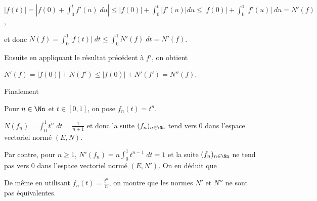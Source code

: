 {{\begin{center}
$|f(t)| = |f(0) +\int_{0}^{t}f'(u)\;du|\leqslant|f(0)|+\int_{0}^{t}|f'(u)|du\leqslant |f(0)|+\int_{0}^{1}|f'(u)|\;du =N'(f)$,
\end{center}

et donc $N(f) =\int_{0}^{1}|f(t)|\;dt\leqslant\int_{0}^{1}N'(f)\;dt=N'(f)$.

Ensuite en appliquant le résultat précédent à $f'$,  on obtient 

\begin{center}
$N'(f)=|f(0)|+N(f')\leqslant|f(0)|+N'(f')=N''(f)$.
\end{center}

Finalement 

\begin{center}
\end{center}

Pour $n\in\Nn$ et $t\in[0,1]$, on pose $f_n(t) = t^n$. 

$N(f_n)=\int_{0}^{1}t^n\;dt= \frac{1}{n+1}$ et donc la suite $(f_n)_{n\in\Nn}$ tend vers $0$ dans l'espace vectoriel normé $(E,N)$.

Par contre, pour $n\geqslant1$, $N'(f_n)=n\int_{0}^{1}t^{n-1}\;dt=1$ et la suite $(f_n)_{n\in\Nn}$  ne tend pas vers $0$ dans l'espace vectoriel normé $(E,N')$. On en déduit que

\begin{center}
\end{center}

De même en utilisant $f_n(t)= \frac{t^n}{n}$, on montre que les normes $N'$ et $N''$ ne sont pas équivalentes.
}
}
